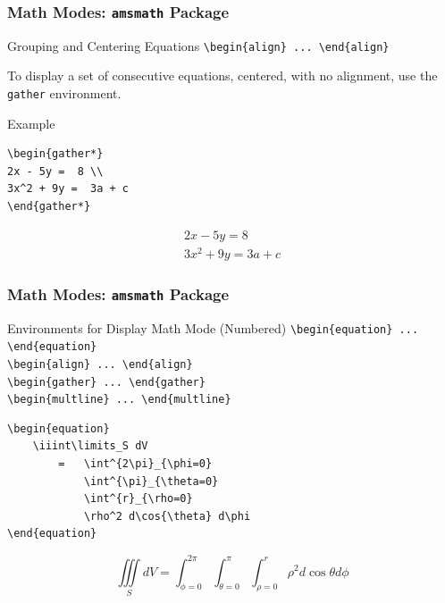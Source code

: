 \begin{frame}[fragile]
\frametitle{Math Modes: \texttt{amsmath} Package} 
\begin{block}{Grouping and Centering Equations}
\small
\verb|\begin{align} ... \end{align}| \\
\end{block}
To display a set of consecutive equations, centered, with no alignment, use the \verb|gather| environment.
\begin{exampleblock}{Example}
\small
\begin{verbatim}
\begin{gather*} 
2x - 5y =  8 \\ 
3x^2 + 9y =  3a + c
\end{gather*}
\end{verbatim}
\begin{gather*} 
2x - 5y =  8 \\ 
3x^2 + 9y =  3a + c
\end{gather*}
\end{exampleblock}
\end{frame}


\begin{frame}[fragile]
\frametitle{Math Modes: \texttt{amsmath} Package} 
\begin{block}{Environments for Display Math Mode (Numbered)}
\small
\verb|\begin{equation} ... \end{equation}| \\
\verb|\begin{align} ... \end{align}| \\
\verb|\begin{gather} ... \end{gather}| \\
\verb|\begin{multline} ... \end{multline}| \\
\end{block}
\begin{exampleblock}{}
\small
\begin{verbatim}
\begin{equation}
    \iiint\limits_S dV 
        =   \int^{2\pi}_{\phi=0} 
            \int^{\pi}_{\theta=0}
            \int^{r}_{\rho=0} 
            \rho^2 d\cos{\theta} d\phi
\end{equation}
\end{verbatim}
    \begin{equation}
        \iiint\limits_S dV 
        =   \int^{2\pi}_{\phi=0} 
            \int^{\pi}_{\theta=0} 
            \int^{r}_{\rho=0} 
            \rho^2 d\cos{\theta} d\phi
    \end{equation}
\end{exampleblock}
\end{frame}


